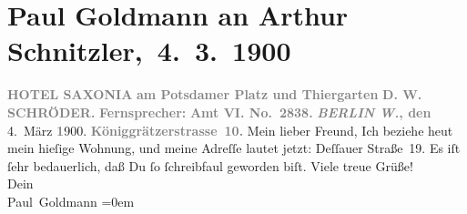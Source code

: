 

         
         \renewcommand{\erwaehntePersonen}{Personen: D. W. Schröder}
         \renewcommand{\erwaehnteOrte}{Orte: Berlin, Dessauer Straße, Hotel Saxonia, Potsdamer Platz, Stresemannstraße, Tiergarten, Wien}
         \renewcommand{\erwaehnteWerke}{}
               \section[ Paul Goldmann an Arthur Schnitzler, 4. 3. 1900]{ Paul Goldmann an Arthur Schnitzler, 4. 3. 1900}\nopagebreak{}\rehead{ }\begin{ledgroupsized}[t]{13cm}\normalsize\beginnumbering \toendnotes[C]{\smallbreak\pagebreak[2]} 
\pstart
           \noindent{}\centering{}{\pb}\textcolor{gray}{\textbf{\textbf{HOTEL SAXONIA}}}\pend
           \pstart
           \noindent{}\raggedleft{}\textcolor{gray}{\textbf{am Potsdamer Platz und
                        Thiergarten}}\pend
           \pstart
           \noindent{}\centering{}\textcolor{gray}{\textbf{D. W. SCHRÖDER.}}\pend
           \pstart
           \noindent{}\textcolor{gray}{\textbf{Fernsprecher:}}\pend
           \pstart
           \textcolor{gray}{\textbf{\textbf{Amt VI. No. 2838.}}}\pend
           \pstart
           \raggedleft{}\textcolor{gray}{\textbf{\emph{BERLIN W.}, den}}{ }4. März \textcolor{gray}{\textbf{1}}900. \pend
           \pstart
           \raggedleft{}\textcolor{gray}{\textbf{Königgrätzerstrasse 10.}}\pend
           \pstart\center{}Mein lieber Freund,\pend\pstart
           Ich beziehe heut mein hieſige Wohnung, und meine
               Adreſſe lautet jetzt: Deſſauer Straße 19.\pend
           \pstart
           Es iſt ſehr bedauerlich, daß Du ſo ſchreibfaul geworden biſt.\pend
           \pstart
           Viele treue Grüße! {\\[\baselineskip]}Dein {\\[\baselineskip]}\spacefill\mbox{Paul Goldmann}\pend
           \leftskip=0em{}
         
         \endnumbering{}\end{ledgroupsized}  \newcommand{\dateiname}{L02906}\newcommand{\titel}{Paul Goldmann an Arthur Schnitzler, 4. 3. 1900}\newcommand{\editorInnen}{Martin Anton Müller und Laura Untner}
      